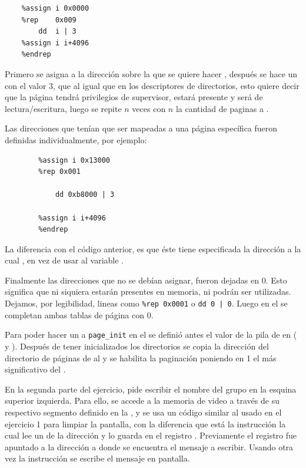 \begin{verbatim}
	%assign i 0x0000 
	%rep    0x009 
	    dd 	i | 3 
	%assign i i+4096 
	%endrep 
\end{verbatim}

	Primero se asigna  a la dirección sobre la que se quiere hacer , después se hace un  con el valor 3, que 
al igual que en los descriptores de directorios, esto quiere decir que la página tendrá privilegios de supervisor, estará presente y será de lectura/escritura, 
luego se repite $n$ veces con $n$ la cantidad de paginas a .

    Las direcciones que tenían que ser mapeadas a una página específica fueron definidas individualmente, por ejemplo: 

\begin{verbatim}
		%assign i 0x13000 
		%rep 0x001 

			dd 0xb8000 | 3 

		%assign i i+4096 
		%endrep 
\end{verbatim}

	La diferencia con el código anterior, es que éste tiene especificada la dirección a la cual , en vez de usar al variable . 

    	Finalmente las direcciones que no se debían asignar, fueron dejadas en 0. Esto significa que ni siquiera estarán presentes en memoria, ni podrán 
ser utilizadas. Dejamos, por legibilidad, lineas como \verb=%rep 0x0001= o \verb=dd 0 | 0=. Luego en el  se completan ambas tablas de página con 0. 

	Para poder hacer un  a \verb=page_init= en el  se definió antes el valor de la pila de  en 
( y ). Después de tener inicializados los directorios se copia la dirección del directorio de páginas de  al  
y se habilita la paginación poniendo en 1 el  más significativo del . 

    En la segunda parte del ejercicio, pide escribir el nombre del grupo en la esquina superior izquierda. Para ello, se accede a la memoria de video a 
través de su respectivo segmento definido en la , y se usa un código similar al usado en el ejercicio 1 para limpiar la pantalla, con la 
diferencia que está la instrucción  la cual lee un  de la dirección  y lo guarda en el registro . Previamente 
el registro  fue apuntado a la dirección a donde se encuentra el mensaje a escribir. Usando otra vez la instrucción  se escribe el 
mensaje en pantalla.

